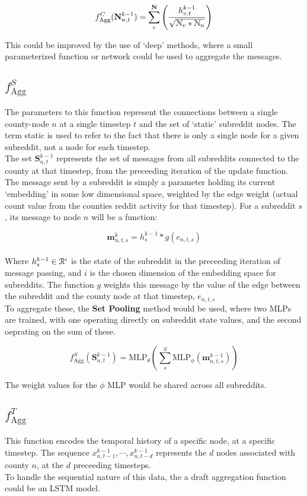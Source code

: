 \documentclass{article}
\begin{document}
$$f_{\text{Agg}}^C(\textbf{N}_{n,t}^{k-1})=\sum_v^{\textbf{N}}\left( \frac{h_{v,t}^{k-1}}{\sqrt{\EuScript{N}_v*\EuScript{N}_n}} \right)$$

This could be improved by the use of `deep' methods, where a small parameterized function or network could be used to aggregate the messages. 

\subsection{$f_{\text{Agg}}^S$}
The parameters to this function represent the connections between a single county-node $n$ at a single timestep $t$ and the set of `static' subreddit nodes. The term static is used to refer to the fact that there is only a single node for a given subreddit, not a node for each timestep. \\
The set $\textbf{S}_{n,t}^{k-1}$ represents the set of messages from all subreddits connected to the county at that timestep, from the preceeding iteration of the update function.\\
The message sent by a subreddit is simply a parameter holding its current `embedding' in some low dimensional space, weighted by the edge weight (actual count value from the counties reddit activity for that timestep). For a subreddit $s$, its message to node $n$ will be a function:

$$\textbf{m}_{n,t,s}^{k} = h_{s}^{k-1}*g(e_{n,t,s})$$\\

Where $h_{s}^{k-1} \in \EuScript{R}^i$ is the state of the subreddit in the preceeding iteration of message passing, and $i$ is the chosen dimension of the embedding space for subreddits. The function $g$ weights this message by the value of the edge between the subreddit and the county node at that timestep, $e_{n,t,s}$
\\
To aggregate these, the \textbf{Set Pooling} method would be used, where two MLPs are trained, with one operating directly on subreddit state values, and the second oeprating on the sum of these.

$$f_{\text{Agg}}^S(\textbf{S}_{n,t}^{k-1})=\text{MLP}_{\theta}\left(\sum_{s}^{S}\text{MLP}_\phi\left(\textbf{m}_{n,t,s}^{k-1}\right)\right)$$

The weight values for the $\phi$ MLP would be shared across all subreddits. 

\subsection{$f_{\text{Agg}}^T$}
This function encodes the temporal history of a specific node, at a specific timestep. The sequence $x_{n,t-1}^{k-1}, \cdots, x_{n, t-d}^{k-1}$ represents the $d$ nodes associated with county $n$, at the $d$ preceeding timesteps. \\
To handle the sequential nature of this data, the a draft aggregation function could be an LSTM model.
\end{document}
